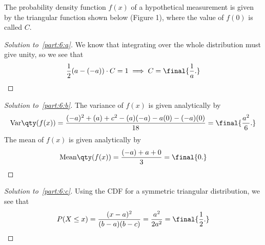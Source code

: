 \documentclass[10pt, physics]{homework}
\begin{document}
	\begin{problem}[12pts]
		The probability density function $f(x)$ of a hypothetical measurement is given by the triangular function shown below (Figure 1), where the value of $f(0)$ is called $C$. 
	\end{problem}
	\begin{proof}[Solution to~\ref{part:6:a}]
		We know that integrating over the whole distribution must give unity, so we see that 
		\[ \frac{1}{2}(a - (-a))\cdot C = 1 \implies C = \final{\frac{1}{a}.}\qedhere \]
	\end{proof}
	\begin{proof}[Solution to~\ref{part:6:b}]
		The variance of $f(x)$ is given analytically by
		\[ \text{Var}\qty(f(x)) = \frac{(-a)^2 + (a) + c^2 - (a)(-a) - a(0) - (-a)(0)}{18} = \final{\frac{a^2}{6}.} \]
		The mean of $f(x)$ is given analytically by 
		\[ \text{Mean}\qty(f(x)) = \frac{(-a) + a + 0}{3} = \final{0.}\qedhere \]
	\end{proof}
	\begin{proof}[Solution to~\ref{part:6:c}]
		Using the CDF for a symmetric triangular distribution, we see that 
		\[ P(X \leq x) = \frac{(x-a)^2}{(b-a)(b-c)} = \frac{a^2}{2a^2} = \final{\frac{1}{2}.}\qedhere \]
	\end{proof}
\end{document}
